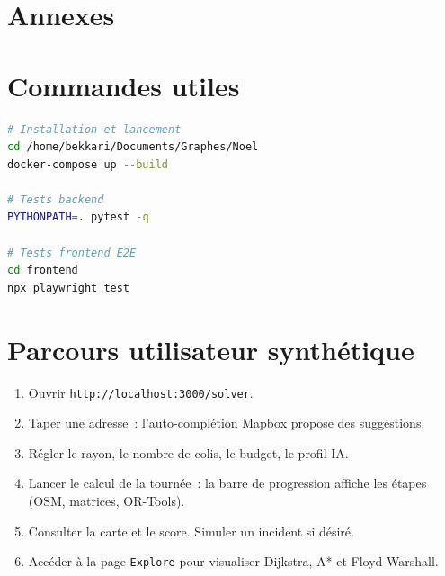 \documentclass[a4paper, 12pt, twoside]{article}
\begin{document}
\section{Annexes}
\appendix
\makeatletter
\def\@seccntformat#1{Annexe~\csname the#1\endcsname:\quad}
\makeatother

\section{Commandes utiles}

\begin{lstlisting}[language=bash]
# Installation et lancement
cd /home/bekkari/Documents/Graphes/Noel
docker-compose up --build

# Tests backend
PYTHONPATH=. pytest -q

# Tests frontend E2E
cd frontend
npx playwright test
\end{lstlisting}

\section{Parcours utilisateur synth\'{e}tique}

\begin{enumerate}
  \item Ouvrir \texttt{http://localhost:3000/solver}.
  \item Taper une adresse~: l'auto-compl\'{e}tion Mapbox propose des suggestions.
  \item R\'{e}gler le rayon, le nombre de colis, le budget, le profil IA.
  \item Lancer le calcul de la tourn\'{e}e~: la barre de progression
        affiche les \'{e}tapes (OSM, matrices, OR-Tools).
  \item Consulter la carte et le score. Simuler un incident si d\'{e}sir\'{e}.
  \item Acc\'{e}der \`{a} la page \texttt{Explore} pour visualiser Dijkstra, A* et Floyd-Warshall.
\end{enumerate}
\end{document}
